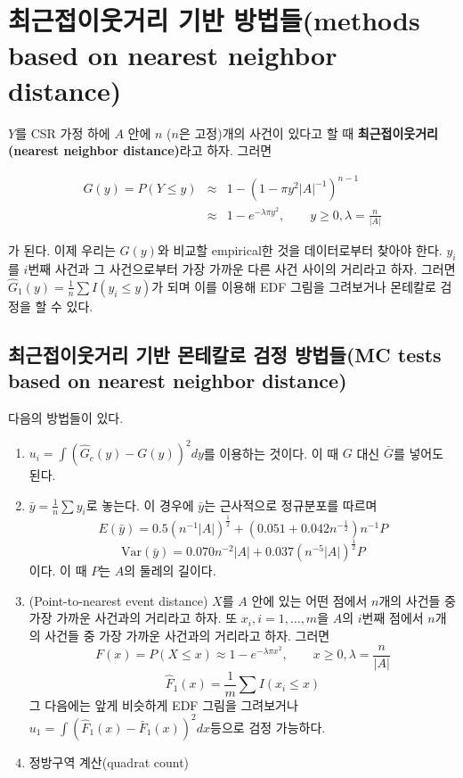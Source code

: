 \documentclass[b5paper,]{scrbook}
\theoremstyle{plain}
\theoremstyle{definition}
\numberwithin{equation}{section}
\begin{document}
\section{최근접이웃거리 기반 방법들(methods based on nearest neighbor
distance)}\label{--methods-based-on-nearest-neighbor-distance}

\(Y\)를 CSR 가정 하에 \(A\) 안에 \(n\) (\(n\)은 고정)개의 사건이 있다고
할 때 \textbf{최근접이웃거리(nearest neighbor distance)}라고 하자.
그러면

\begin{eqnarray*}
G(y)=P(Y\leq y)&\approx & 1-(1-\pi y^{2}|A|^{-1})^{n-1}\\
&\approx& 1-e^{-\lambda \pi y^{2}}, \qquad{y \geq 0, \lambda =\frac{n}{|A|}}
\end{eqnarray*}

가 된다. 이제 우리는 \(G(y)\)와 비교할 empirical한 것을 데이터로부터
찾아야 한다. \(y_{i}\)를 \(i\)번째 사건과 그 사건으로부터 가장 가까운
다른 사건 사이의 거리라고 하자. 그러면
\(\hat{G}_{1}(y)=\frac{1}{n}\sum I(y_{i} \leq y)\)가 되며 이를 이용해
EDF 그림을 그려보거나 몬테칼로 검정을 할 수 있다.

\subsection{최근접이웃거리 기반 몬테칼로 검정 방법들(MC tests based on
nearest neighbor
distance)}\label{----mc-tests-based-on-nearest-neighbor-distance}

다음의 방법들이 있다.

\begin{enumerate}
\def\labelenumi{\arabic{enumi}.}
\item
  \(u_{i}=\int (\hat{G}_{c}(y)-G(y))^{2}dy\)를 이용하는 것이다. 이 때
  \(G\) 대신 \(\bar{G}\)를 넣어도 된다.
\item
  \citep{Clark1954} \(\bar{y}=\frac{1}{n}\sum y_{i}\)로 놓는다. 이
  경우에 \(\bar{y}\)는 근사적으로 정규분포를 따르며
  \[E(\bar{y})=0.5(n^{-1}|A|)^{\frac{1}{2}} + (0.051 + 0.042 n^{-\frac{1}{2}})n^{-1}P\]
  \[\text{Var}(\bar{y})=0.070n^{-2}|A| + 0.037(n^{-5}|A|)^{\frac{1}{2}}P\]
  이다. 이 때 \(P\)는 \(A\)의 둘레의 길이다.
\item
  (Point-to-nearest event distance) \(X\)를 \(A\) 안에 있는 어떤 점에서
  \(n\)개의 사건들 중 가장 가까운 사건과의 거리라고 하자. 또
  \(x_{i}, i=1,\ldots ,m\)을 \(A\)의 \(i\)번째 점에서 \(n\)개의 사건들
  중 가장 가까운 사건과의 거리라고 하자. 그러면
  \[F(x)=P(X\leq x) \approx 1 - e^{-\lambda \pi x^{2}}, \qquad{x \geq 0, \lambda = \frac{n}{|A|}}\]
  \[\hat{F}_{1}(x)=\frac{1}{m}\sum I(x_{i}\leq x)\] 그 다음에는 앞게
  비슷하게 EDF 그림을 그려보거나
  \(u_{1}=\int (\hat{F}_{1}(x)-\bar{F}_{1}(x))^{2}dx\)등으로 검정
  가능하다.
\item
  정방구역 계산(quadrat count)
\end{enumerate}
\end{document}
